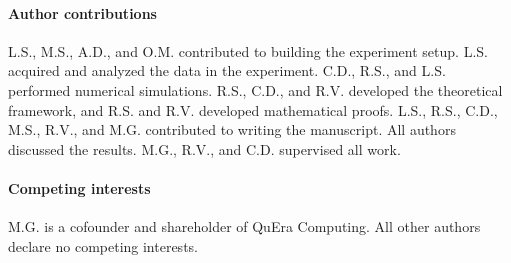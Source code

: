 \documentclass[preprint,superscriptaddress,floatfix, nofootinbib]{revtex4-2}
\begin{document}
\paragraph*{Author contributions}
L.S., M.S., A.D., and O.M. contributed to building the experiment setup. L.S. acquired and analyzed the data in the experiment. C.D., R.S., and L.S. performed numerical simulations. R.S., C.D., and R.V. developed the theoretical framework, and R.S. and R.V. developed mathematical proofs. L.S., R.S., C.D., M.S., R.V., and M.G. contributed to writing the manuscript. All authors discussed the results. M.G., R.V., and C.D. supervised all work.

\paragraph*{Competing interests}
M.G. is a cofounder and shareholder of QuEra Computing. All other authors declare no competing interests.

\nocite{*}

\end{document}
